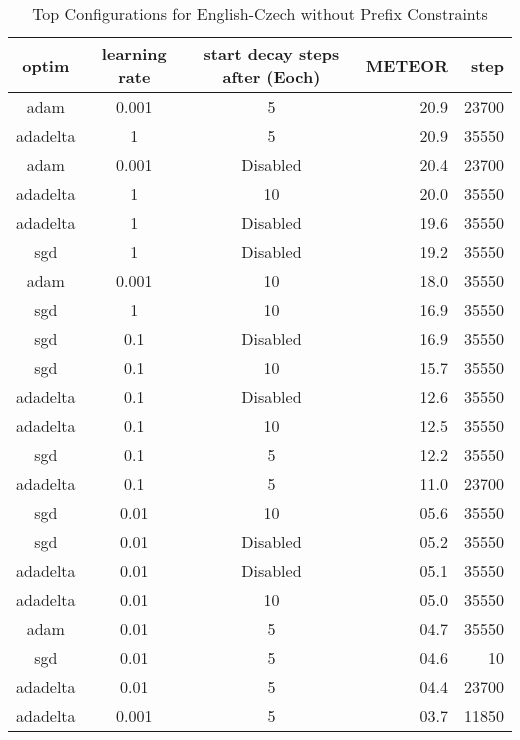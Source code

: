 \begin{table}
	\caption{Top Configurations for English-Czech without Prefix Constraints}
	\label{tab:ranking_example}
	\centering
\begin{tabular}{|c|c|c|r|r|}
	\hline
	optim   & learning rate & start decay steps after (Eoch)  & METEOR &  step \\
	\hline
	   adam   &     0.001     &        5        & 20.9 & 23700 \\
	 adadelta &       1       &        5        & 20.9 & 35550 \\
	   adam   &     0.001     & Disabled        & 20.4 & 23700 \\
	 adadelta &       1       &       10        & 20.0 & 35550 \\
	 adadelta &       1       & Disabled        & 19.6 & 35550 \\
	   sgd    &       1       & Disabled        & 19.2 & 35550 \\
	   adam   &     0.001     &       10        & 18.0 & 35550 \\
	   sgd    &       1       &       10        & 16.9 & 35550 \\
	   sgd    &      0.1      & Disabled        & 16.9 & 35550 \\
	   sgd    &      0.1      &       10        & 15.7 & 35550 \\
	 adadelta &      0.1      & Disabled        & 12.6 & 35550 \\
	 adadelta &      0.1      &       10        & 12.5 & 35550 \\
	   sgd    &      0.1      &        5        & 12.2 & 35550 \\
	 adadelta &      0.1      &        5        & 11.0 & 23700 \\
	   sgd    &      0.01     &       10        & 05.6 & 35550 \\
	   sgd    &      0.01     & Disabled        & 05.2 & 35550 \\
	 adadelta &      0.01     & Disabled        & 05.1 & 35550 \\
	 adadelta &      0.01     &       10        & 05.0 & 35550 \\
	   adam   &      0.01     &        5        & 04.7 & 35550 \\
	   sgd    &      0.01     &        5        & 04.6 & 10 \\
	 adadelta &      0.01     &        5        & 04.4 & 23700 \\
	 adadelta &     0.001     &        5        & 03.7 & 11850 \\

\end{tabular}
\end{table}
